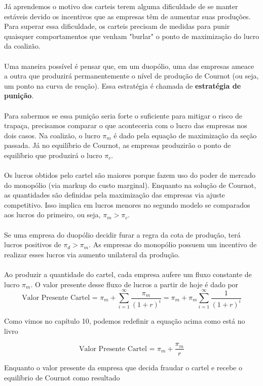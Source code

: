 \documentclass[a4paper,11pt,oneside]{book}
\theoremstyle{definition}
\theoremstyle{break}
\begin{document}
Já aprendemos o motivo dos carteis terem alguma dificuldade de se manter estáveis devido os incentivos que as empresas têm de aumentar suas produções. Para superar essa dificuldade, os carteis precisam de medidas para punir quaisquer comportamentos que venham "burlar" o ponto de maximização do lucro da coalizão.
\\~\\
Uma maneira possível é pensar que, em um duopólio, uma das empresas ameace a outra que produzirá permanentemente o nível de produção de Cournot (ou seja, um ponto na curva de reação). Essa estratégia é chamada de \textbf{estratégia de punição}.
\\~\\
Para sabermos se essa punição seria forte o suficiente para mitigar o risco de trapaça, precisamos comparar o que aconteceria com o lucro das empresas nos dois casos. Na coalizão, o lucro $\pi_m$ é dado pela equação de maximização da seção passada. Já no equilíbrio de Cournot, as empresas produzirão o ponto de equilíbrio que produzirá o lucro $\pi_c$.
\\~\\
Os lucros obtidos pelo cartel são maiores porque fazem uso do poder de mercado do monopólio (via markup do custo marginal). Enquanto na solução de Cournot, as quantidades são definidas pela maximização das empresas via ajuste competitivo. Isso implica em lucros menores no segundo modelo se comparados aos lucros do primeiro, ou seja, $\pi_m > \pi_c$.
\\~\\
Se uma empresa do duopólio decidir furar a regra da cota de produção, terá lucros positivos de $\pi_d > \pi_m$. As empresas do monopólio possuem um incentivo de realizar esses lucros via aumento unilateral da produção.
\\~\\
Ao produzir a quantidade do cartel, cada empresa aufere um fluxo constante de lucro $\pi_m$. O valor presente desse fluxo de lucros a partir de hoje é dado por
$$ \textrm{Valor Presente Cartel = } \pi_m + \displaystyle \sum^{\infty}_{i = 1} \frac{\pi_m}{(1 + r)^i} = \pi_m + \pi_m \displaystyle \sum^{\infty}_{i = 1} \frac{1}{(1 + r)^i} $$

Como vimos no capítulo 10, podemos redefinir a equação acima como está no livro

$$ \textrm{Valor Presente Cartel = } \pi_m + \frac{\pi_m}{r} $$

Enquanto o valor presente da empresa que decida fraudar o cartel e recebe o equilíbrio de Cournot como resultado
\end{document}

